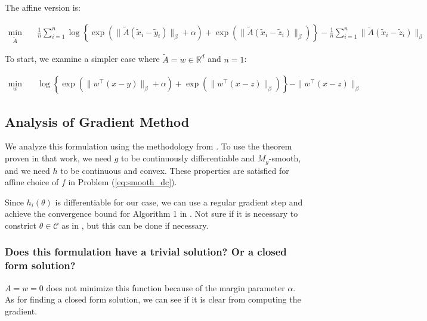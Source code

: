 \documentclass[11pt]{article}
\begin{document}
The affine version is:

\begin{equation}
\begin{aligned}
    \min_{\tilde{A}} \quad & \frac{1}{n} \sum_{i=1}^{n} \log\left\{ \exp \left(\| \tilde{A}(\tilde{x}_i - \tilde{y}_i) \|_\beta + \alpha \right) + \exp \left(\| \tilde{A}(\tilde{x}_i - \tilde{z}_i) \|_\beta \right)  \right \} - \frac{1}{n} \sum_{i=1}^{n} \| \tilde{A}(\tilde{x}_i - \tilde{z}_i) \|_\beta
\end{aligned}
\end{equation}

To start, we examine a simpler case where $\tilde{A} = w \in \mathbb{R}^d$ and $n = 1$:

\begin{equation}
\begin{aligned}
    \min_{w} \quad & \log\left\{ \exp \left(\| w^{\top}(x - y) \|_\beta + \alpha \right) + \exp \left(\| w^{\top}(x - z) \|_\beta \right)  \right \} - \| w^{\top}(x - z) \|_\beta
\end{aligned}
\end{equation}

\subsection{Analysis of Gradient Method}

We analyze this formulation using the methodology from \cite{khamaru_convergence_nodate}. To use the theorem proven in that work, we need $g$ to be continuously differentiable and $M_g$-smooth, and we need $h$ to be continuous and convex. These properties are satisfied for affine choice of $f$ in Problem (\ref{eq:smooth_dc}).

Since $h_i(\theta)$ is differentiable for our case, we can use a regular gradient step and achieve the convergence bound for Algorithm 1 in \cite{khamaru_convergence_nodate}. Not sure if it is necessary to constrict $\theta \in \mathcal{C}$ as in \cite{khamaru_convergence_nodate}, but this can be done if necessary.

\subsubsection{Does this formulation have a trivial solution? Or a closed form solution?}

$A = w = 0$ does not minimize this function because of the margin parameter $\alpha$. As for finding a closed form solution, we can see if it is clear from computing the gradient.
\end{document}
